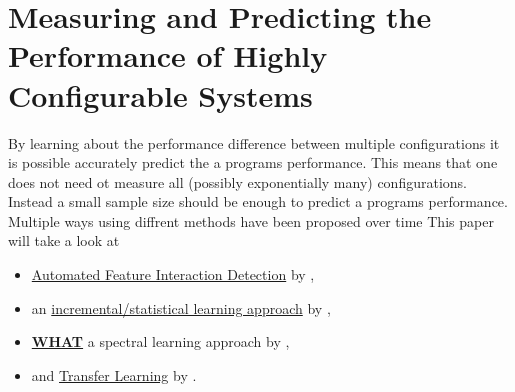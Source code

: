 \section{Measuring and Predicting the Performance of Highly Configurable Systems}\label{sec:measuring}

By learning about the performance difference between multiple configurations it is possible accurately predict the a programs performance. This means that one does not need ot measure all (possibly exponentially many) configurations. Instead a small sample size should be enough to predict a programs performance. Multiple ways using diffrent methods have been proposed over time \cite{FasterDiscoveryofFasterSystemConfigurationsSiegmund2017} This paper will take a look at
\begin{itemize}
	\item \hyperref[sec:AFID]{Automated Feature Interaction Detection} by \citet{AutomatedFeatureDetectionSiegmund2012},
	\item an \hyperref[sec:IncrementalApproach]{incremental/statistical learning approach} by \citet{VariabilityAwarePerformancePredictionJianmeiSigmundApel},
	\item \hyperref[sec:WHAT]{\textbf{WHAT}} a spectral learning approach by \citet{FasterDiscoveryofFasterSystemConfigurationsSiegmund2017},
	\item and \hyperref[sec:TransferLearning]{Transfer Learning} by \citet{TransferLearningforImprovingModelPredictionsJamshidiVKSK17}.
\end{itemize}





%






